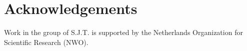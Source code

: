 \section{Acknowledgements}
Work in the group of S.J.T. is supported by the Netherlands Organization for Scientific Research (NWO).






















